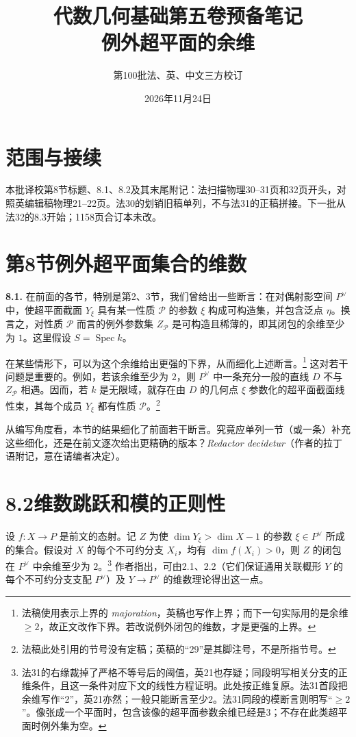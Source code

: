 \documentclass[openany,fontset=fandol]{ctexbook}
\DeclareMathOperator{\Spec}{Spec}
\begin{document}
\title{代数几何基础第五卷预备笔记\\例外超平面的余维}
\author{第100批\quad 法、英、中文三方校订}
\date{2026年11月24日}
\maketitle
\section*{范围与接续}
本批译校第8节标题、8.1、8.2及其末尾附记：法扫描物理30--31页和32页开头，对照英编辑稿物理21--22页。法30的划销旧稿单列，不与法31的正稿拼接。下一批从法32的8.3开始；1158页合订本未改。
\section*{第8节\quad 例外超平面集合的维数}
\textbf{8.1.}
在前面的各节，特别是第2、3节，我们曾给出一些断言：在对偶射影空间 $P^\vee$ 中，使超平面截面 $Y_\xi$ 具有某一性质 $\mathcal P$ 的参数 $\xi$ 构成可构造集，并包含泛点 $\eta$。换言之，对性质 $\mathcal P$ 而言的例外参数集 $Z_{\mathcal P}$ 是可构造且稀薄的，即其闭包的余维至少为 $1$。这里假设 $S=\Spec k$。

在某些情形下，可以为这个余维给出更强的下界，从而细化上述断言。\footnote{法稿使用表示上界的 \emph{majoration}，英稿也写作上界；而下一句实际用的是余维 $\ge 2$，故正文改作下界。若改说例外闭包的维数，才是更强的上界。}
这对若干问题是重要的。例如，若该余维至少为 $2$，则 $P^\vee$ 中一条充分一般的直线 $D$ 不与 $Z_{\mathcal P}$ 相遇。因而，若 $k$ 是无限域，就存在由 $D$ 的几何点 $\xi$ 参数化的超平面截面线性束，其每个成员 $Y_\xi$ 都有性质 $\mathcal P$。\footnote{法稿此处引用的节号没有定稿；英稿的“29”是其脚注号，不是所指节号。}

从编写角度看，本节的结果细化了前面若干断言。究竟应单列一节（或一条）补充这些细化，还是在前文逐次给出更精确的版本？\emph{Redactor decidetur}（作者的拉丁语附记，意在请编者决定）。
\section*{8.2\quad 维数跳跃和模的正则性}
设 $f:X\to P$ 是前文的态射。记 $Z$ 为使 $\dim Y_\xi>\dim X-1$ 的参数 $\xi\in P^\vee$ 所成的集合。假设对 $X$ 的每个不可约分支 $X_i$，均有 $\dim f(X_i)>0$，则 $Z$ 的闭包在 $P^\vee$ 中余维至少为 $2$。\footnote{法31的右缘裁掉了严格不等号后的阈值，英21也存疑；同段明写相关分支的正维条件，且这一条件对应下文的线性方程证明。此处按正维复原。法31首段把余维写作“2”，英21亦然；一般只能断言至少2。法31同段的模断言则明写“$\ge2$”。像张成一个平面时，包含该像的超平面参数余维已经是3；不存在此类超平面时例外集为空。}
作者指出，可由2.1、2.2（它们保证通用关联概形 $Y$ 的每个不可约分支支配 $P^\vee$）及 $Y\to P^\vee$ 的维数理论得出这一点。
\end{document}
